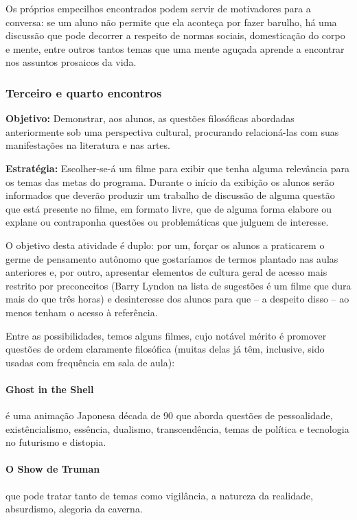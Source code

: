 \documentclass[12pt,a4paper]{article}
\begin{document}
	Os próprios empecilhos encontrados podem servir de motivadores 
	para a conversa: se um aluno não permite que ela aconteça por 
	fazer barulho, há uma discussão que pode decorrer a respeito 
	de normas sociais, domesticação do corpo e mente, entre outros 
	tantos temas que uma mente aguçada aprende a encontrar nos 
	assuntos prosaicos da vida.

	\subsubsection{Terceiro e quarto encontros}
	
	\textbf{Objetivo:} Demonstrar, aos alunos, as questões 
	filosóficas abordadas anteriormente sob uma perspectiva 
	cultural, procurando relacioná-las com suas manifestações 
	na literatura e nas artes. 

	\textbf{Estratégia:}
	Escolher-se-á um filme para exibir que tenha alguma relevância 
	para os temas das metas do programa. Durante o início da 
	exibição os alunos serão informados que deverão produzir um 
	trabalho de discussão de alguma questão que está presente no 
	filme, em formato livre, que de alguma forma elabore ou 
	explane ou contraponha questões ou problemáticas que julguem
	de interesse. 

	O objetivo desta atividade é duplo: por um, forçar os alunos 
	a praticarem o germe de pensamento autônomo que gostaríamos 
	de termos plantado nas aulas anteriores e, por outro, apresentar
	elementos de cultura geral de acesso mais restrito por 
	preconceitos (Barry Lyndon na lista de sugestões é um filme 
	que dura mais do que três horas) e desinteresse dos alunos para 
	que -- a despeito disso -- ao menos tenham o acesso à referência. 

	Entre as possibilidades, temos alguns filmes, cujo notável
	mérito é promover questões de ordem claramente filosófica
	(muitas delas já têm, inclusive, sido usadas com frequência 
	em sala de aula): 

	\paragraph{Ghost in the Shell} é uma animação 
		Japonesa década de 90 que aborda questões de 
		pessoalidade, existêncialismo, essência, 
		dualismo, transcendência, temas de política e 
		tecnologia no futurismo e distopia.

	\paragraph{O Show de Truman} que pode tratar tanto de 
		temas como vigilância, a natureza da realidade,
		absurdismo, alegoria da caverna.
\end{document}
